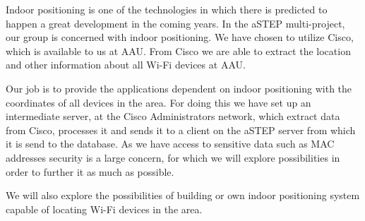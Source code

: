 
Indoor positioning is one of the technologies in which there is predicted to happen a great development in the coming years. In the aSTEP multi-project, our group is concerned with indoor positioning. We have chosen to utilize Cisco, which is available to us at AAU. From Cisco we are able to extract the location and other information about all Wi-Fi devices at AAU.

Our job is to provide the applications dependent on indoor positioning with the coordinates of all devices in the area. For doing this we have set up an intermediate server, at the Cisco Administrators network, which extract data from Cisco, processes it and sends it to a client on the aSTEP server from which it is send to the database. As we have access to sensitive data such as MAC addresses security is a large concern, for which we will explore possibilities in order to further it as much as possible.

We will also explore the possibilities of building or own indoor positioning system capable of locating Wi-Fi devices in the area.




